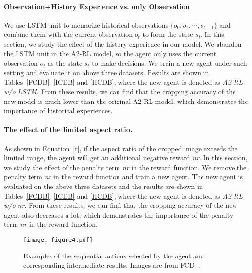 \documentclass[10pt,twocolumn,letterpaper]{article}
\begin{document}
\paragraph{Observation+History Experience vs. only Observation}
We use LSTM unit to memorize historical observations $\{o_0,o_1,\cdots,o_{t-1}\}$ and combine them with the current observation $o_t$ to form the state $s_t$. In this section, we study the effect of the history experience in our model. We abandon the LSTM unit in the A2-RL model, so the agent only uses the current observation $o_t$ as the state $s_t$ to make decisions. We train a new agent under such setting and evaluate it on above three datasets. Results are shown in Tables~\ref{FCDB}, \ref{ICDB} and \ref{HCDB}, where the new agent is denoted as \emph{A2-RL w/o LSTM}. From these results, we can find that the cropping accuracy of the new model is much lower than the original A2-RL model, which demonstrates the importance of historical experiences.
\paragraph{The effect of the limited aspect ratio.}
As shown in Equation~\ref{r}, if the aspect ratio of the cropped image exceeds the limited range, the agent will get an additional negative reward \emph{nr}. In this section, we study the effect of the penalty term \emph{nr} in the reward function. We remove the penalty term \emph{nr} in the reward function and train a new agent. The new agent is evaluated on the above three datasets and the results are shown in Tables~\ref{FCDB}, \ref{ICDB} and \ref{HCDB}, where the new agent is denoted as \emph{A2-RL w/o nr}. From these results, we can find that the cropping accuracy of the new agent also decreases a lot, which demonstrates the importance of the penalty term \emph{nr} in the reward function.
\begin{figure*}[ht]
\begin{center}
\texttt{[image: figure4.pdf]}
\end{center}
\caption{Examples of the sequential actions selected by the agent and corresponding intermediate results. Images are from FCD~\cite{chen2017quantitative}.}
\label{fig:3}
\end{figure*}
\end{document}
